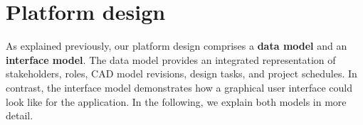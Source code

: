 \section{Platform design}
\label{sec:contribution}

As explained previously, our platform design comprises a \textbf{data model} and an \textbf{interface model}.
The data model provides an integrated representation of stakeholders, roles, CAD model revisions, design tasks, and project schedules.
In contrast, the interface model demonstrates how a graphical user interface could look like for the application.
In the following, we explain both models in more detail.


%
